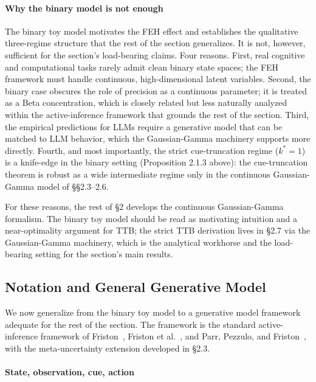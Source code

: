 \documentclass{article}
\begin{document}
\paragraph{Why the binary model is not
enough}\label{why-the-binary-model-is-not-enough}

The binary toy model motivates the FEH effect and establishes the
qualitative three-regime structure that the rest of the section
generalizes. It is not, however, sufficient for the section's
load-bearing claims. Four reasons. First, real cognitive and
computational tasks rarely admit clean binary state spaces; the FEH
framework must handle continuous, high-dimensional latent variables.
Second, the binary case obscures the role of precision as a continuous
parameter; it is treated as a Beta concentration, which is closely
related but less naturally analyzed within the active-inference
framework that grounds the rest of the section. Third, the empirical
predictions for LLMs require a generative model that can be matched to
LLM behavior, which the Gaussian-Gamma machinery supports more directly.
Fourth, and most importantly, the strict cue-truncation regime
(\(k^{*} = 1\)) is a knife-edge in the binary setting (Proposition 2.1.3
above): the cue-truncation theorem is robust as a wide intermediate
regime only in the continuous Gaussian-Gamma model of \S{}\S{}2.3--2.6.

For these reasons, the rest of \S{}2 develops the continuous Gaussian-Gamma
formalism. The binary toy model should be read as motivating intuition
and a near-optimality argument for TTB; the strict TTB derivation lives
in \S{}2.7 via the Gaussian-Gamma machinery, which is the analytical
workhorse and the load-bearing setting for the section's main results.

\subsection{Notation and General Generative
Model}\label{notation-and-general-generative-model}

We now generalize from the binary toy model to a generative model
framework adequate for the rest of the section. The framework is the
standard active-inference framework of Friston~\cite{friston2010}, Friston et al.~\cite{friston2017}, and Parr, Pezzulo, and Friston~\cite{parr2022}, with the meta-uncertainty
extension developed in \S{}2.3.

\paragraph{State, observation, cue,
action}\label{state-observation-cue-action}
\end{document}
